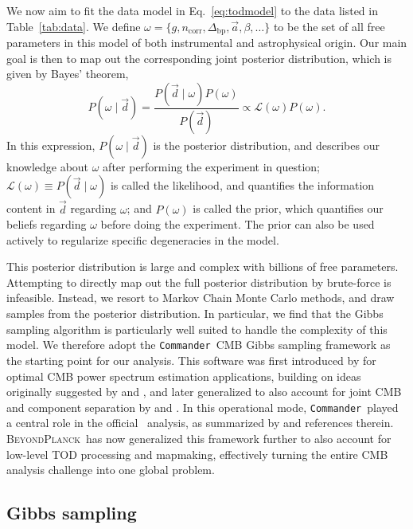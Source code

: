 \documentclass[twocolumn]{aa}
\def\commander{\texttt{Commander}}
\renewcommand{\d}[0]{\vec{d}}
\renewcommand{\a}[0]{\vec{a}}
\newcommand{\Dbp}[0]{\Delta_{\mathrm{bp}}}
\newcommand{\BP}{\textsc{BeyondPlanck}}
\newcommand{\?}[1]{\textcolor{red}{{\bf [#1]}}}
\begin{document}
We now aim to fit the data model in Eq.~\eqref{eq:todmodel} to
the data listed in Table~\ref{tab:data}. We define
$\omega=\{g,n_{\mathrm{corr}},\Dbp,\a,\beta,\ldots\}$ to be the set of
all free parameters in this model of both instrumental and
astrophysical origin. Our main goal is then to map out the
corresponding joint posterior distribution, which is given by Bayes'
theorem,
\begin{equation}
    P(\omega\mid \d) = \frac{P(\d\mid \omega)P(\omega)}{P(\d)} \propto
  \mathcal{L}(\omega)P(\omega).
  \label{eq:jointpost}
\end{equation}
In this expression, $P(\omega\mid \d)$ is the posterior distribution, and
describes our knowledge about $\omega$ after performing the experiment in
question; $\mathcal{L}(\omega)\equiv P(\d\mid \omega)$ is called the likelihood,
and quantifies the information content in $\d$ regarding $\omega$; and
$P(\omega)$ is called the prior, which quantifies our beliefs regarding $\omega$
before doing the experiment. The prior can also be used actively to regularize
specific degeneracies in the model.

This posterior distribution is large and complex with billions of free
parameters. Attempting to directly map out the full posterior
distribution by brute-force is infeasible. Instead, we resort to
Markov Chain Monte Carlo methods, and draw samples from the posterior
distribution. In particular, we find that the Gibbs sampling algorithm
\citep{geman:1984} is particularly well suited to handle the
complexity of this model. We therefore adopt the \commander\ CMB Gibbs
sampling framework as the starting point for our analysis. This
software was first introduced by \citet{eriksen:2004} for optimal CMB
power spectrum estimation applications, building on ideas originally suggested by
\citet{jewell2004} and \citet{wandelt2004}, and later generalized to
also account for joint CMB and component separation by
\citet{eriksen2008} and \citet{seljebotn:2019}. In this operational
mode, \commander\ played a central role in the official
\Planck\ analysis, as summarized by
\citet{planck2013-p01,planck2014-a01,planck2016-l01} and references
therein. \BP\ has now generalized this framework further to also
account for low-level TOD processing and mapmaking, effectively
turning the entire CMB analysis challenge into one global problem.

\subsection{Gibbs sampling}
\label{sec:gibbs}
\end{document}
